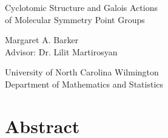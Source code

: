 \documentclass{article}
\begin{document}
    \thispagestyle{empty}
    
    \begin{center}
        {\huge Cyclotomic Structure and Galois Actions\\\vspace{0.25em}of Molecular Symmetry Point Groups}\vspace{1cm}
        
        {\large Margaret A. Barker\\Advisor: Dr. Lilit Martirosyan\vspace{1cm}
        
        University of North Carolina Wilmington\\Department of Mathematics and Statistics\vspace{1cm}}
    \end{center}

    \vfill

    \section*{Abstract}
    
    
\end{document}
